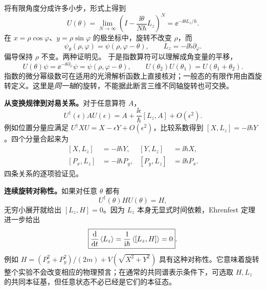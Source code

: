 将有限角度分成许多小步，形式上得到
\begin{equation}
  U(\theta)=\lim_{N\to\infty}
  \left(I-\frac{\ii\theta}{N\hbar}L_z\right)^N
  =\boxed{\ee^{-\ii\theta L_z/\hbar}}.
\end{equation}
在 $x=\rho\cos\varphi$、$y=\rho\sin\varphi$ 的极坐标中，旋转不改变 $\rho$，而
\begin{equation}
  \psi_\theta(\rho,\varphi)=\psi(\rho,\varphi-\theta),\qquad
  \boxed{L_z=-\ii\hbar\partial_\varphi}.
  \label{eq:QM-C12-S02-polar}
\end{equation}
偏导保持 $\rho$ 不变。两种证明见。
于是指数算符可以理解成角变量的平移，
\begin{equation}
  U(\theta)\psi=\ee^{-\theta\partial_\varphi}\psi
  =\psi(\rho,\varphi-\theta),\qquad
  U(\theta_2)U(\theta_1)=U(\theta_1+\theta_2).
\end{equation}
指数的微分幂级数可在适用的光滑解析函数上直接核对；一般态的有限作用由酉旋转定义。这里是\emph{同一轴}的旋转，不能据此断言三维不同轴旋转也可交换。

\textbf{从变换规律到对易关系。}对于任意算符 $A$，
\begin{equation}
  U^\dagger(\epsilon)AU(\epsilon)
  =A+\frac{\ii\epsilon}{\hbar}[L_z,A]+O(\epsilon^2).
\end{equation}
例如位置分量应满足 $U^\dagger XU=X-\epsilon Y+O(\epsilon^2)$，比较系数得到 $[X,L_z]=-\ii\hbar Y$。四个分量合起来为
\begin{equation}
  \boxed{\begin{aligned}
    [X,L_z]&=-\ii\hbar Y,&[Y,L_z]&=\ii\hbar X,\\
    [P_x,L_z]&=-\ii\hbar P_y,&[P_y,L_z]&=\ii\hbar P_x.
  \end{aligned}}
  \label{eq:QM-C12-S02-component-commutators}
\end{equation}
四条关系的逐项验证见。

\textbf{连续旋转对称性。}如果对任意 $\theta$ 都有
\begin{equation}
  U^\dagger(\theta)HU(\theta)=H,
\end{equation}
无穷小展开就给出 $[L_z,H]=0$。因为 $L_z$ 本身无显式时间依赖，Ehrenfest 定理进一步给出
\begin{equation}
  \boxed{\frac{\mathop{}\!\mathrm{d}}{\mathop{}\!\mathrm{d} t}\left\langle L_z \right\rangle
    =\frac{1}{\mathrm{i}\hbar}\left\langle [L_z,H] \right\rangle=0}.
\end{equation}
例如 $H=(P_x^2+P_y^2)/(2m)+V(\sqrt{X^2+Y^2})$ 具有这种对称性。它意味着旋转整个实验不会改变相应的物理预言；在通常的共同谱表示条件下，可选取 $H,L_z$ 的共同本征基，但任意状态不必已经是它们的本征态。

